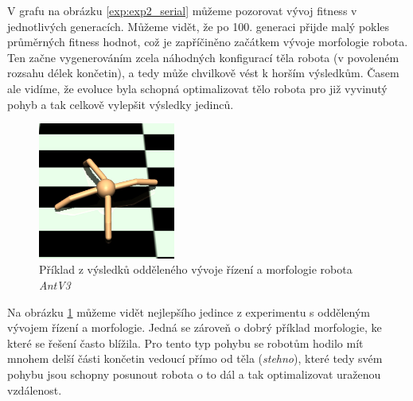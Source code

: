 V grafu na obrázku \ref{exp:exp2_serial} můžeme pozorovat vývoj fitness v
jednotlivých generacích. Můžeme vidět, že po 100. generaci přijde malý pokles
průměrných fitness hodnot, což je zapříčiněno začátkem vývoje morfologie
robota. Ten začne vygenerováním zcela náhodných konfigurací těla robota (v
povoleném rozsahu délek končetin), a tedy může chvilkově vést k horším
výsledkům. Časem ale vidíme, že evoluce byla schopná optimalizovat tělo robota
pro již vyvinutý pohyb a tak celkově vylepšit výsledky jedinců.

\begin{figure}[h!]
    \centering
    \includegraphics[width=0.4\textwidth]{../img/crop_exp2_serial_top1.jpg}
    \caption{Příklad z výsledků odděleného vývoje řízení a morfologie robota
    \emph{AntV3}}
    \label{fig:exp2_serial_body_show}
\end{figure}

Na obrázku \ref{fig:exp2_serial_body_show} můžeme vidět nejlepšího jedince z
experimentu s odděleným vývojem řízení a morfologie. Jedná se zároveň o dobrý
příklad morfologie, ke které se řešení často blížila. Pro tento typ pohybu se 
robotům hodilo mít mnohem delší části končetin vedoucí přímo od těla
(\emph{stehno}), které tedy svém pohybu jsou schopny posunout robota o to
dál a tak optimalizovat uraženou vzdálenost.

